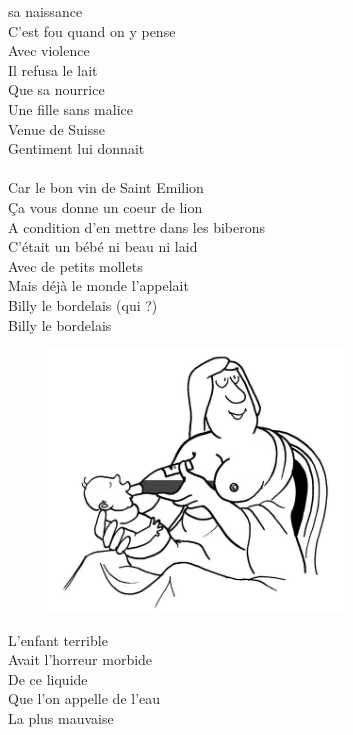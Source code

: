 
 sa naissance
\\C'est fou quand on y pense
\\Avec violence
\\Il refusa le lait
\\Que sa nourrice
\\Une fille sans malice
\\Venue de Suisse
\\Gentiment lui donnait
\\\\Car le bon vin de Saint Emilion
\\Ça vous donne un coeur de lion
\\A condition d'en mettre dans les biberons
\\C'était un bébé ni beau ni laid
\\Avec de petits mollets
\\Mais déjà le monde l'appelait
\\Billy le bordelais (qui ?)
\\Billy le bordelais
\begin{figure}[h!]
\centering
   \includegraphics[width=0.7\textwidth]{images/Billy.png}
 \end{figure}
\breakpage
L'enfant terrible
\\Avait l'horreur morbide
\\De ce liquide
\\Que l'on appelle de l'eau
\\La plus mauvaise
